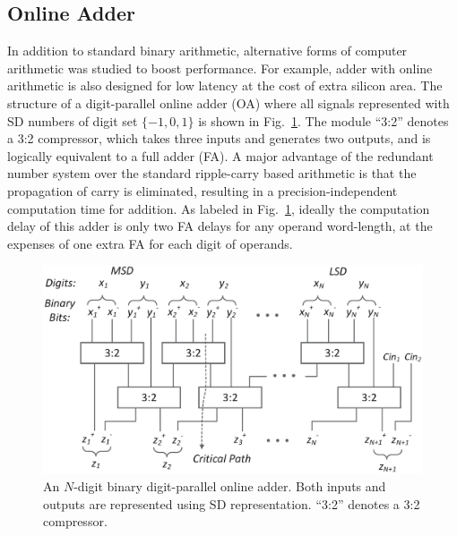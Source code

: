 \documentclass[10pt, conference, compsocconf]{IEEEtran}
\begin{document}
\subsection{Online Adder}\label{subsec:online_adder}
In addition to standard binary arithmetic, alternative forms of computer arithmetic was studied to boost performance. For example, adder with online arithmetic is also designed for low latency at the cost of extra silicon area. The structure of a digit-parallel online adder (OA) where all signals represented with SD numbers of digit set $\{-1,0,1\}$ is shown in Fig.~\ref{Fig:Radix2SD_adder}. The module ``3:2'' denotes a 3:2 compressor, which takes three inputs and generates two outputs, and is logically equivalent to a full adder (FA). A major advantage of the redundant number system over the standard ripple-carry based arithmetic is that the propagation of carry is eliminated, resulting in a precision-independent computation time for addition. As labeled in Fig.~\ref{Fig:Radix2SD_adder}, ideally the computation delay of this adder is only two FA delays for any operand word-length, at the expenses of one extra FA for each digit of operands. 
%
\begin{figure}[tbp]
  \centering
  \includegraphics[width=.45\textwidth]{./figures/SDAdder.eps}
  \vspace{-1ex}
  \caption{An $N$-digit binary digit-parallel online adder. Both inputs and outputs are represented using SD representation. ``3:2'' denotes a 3:2 compressor.}
  \label{Fig:Radix2SD_adder}
  \vspace{-2ex}
\end{figure}
\end{document}
